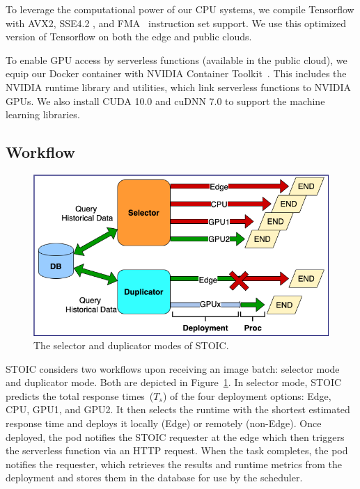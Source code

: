 To leverage the computational power of our CPU systems, we compile Tensorflow with AVX2, SSE4.2 \cite{ref:avx}, and FMA~\cite{ref:fma} instruction set support. We use this optimized version of Tensorflow on both the edge and public clouds.
 
To enable GPU access by serverless functions (available in the public cloud), we equip our Docker container with NVIDIA Container Toolkit~\cite{ref:nvidia}. This includes the NVIDIA runtime library and utilities, which link serverless functions to NVIDIA GPUs. We also install CUDA 10.0 and cuDNN 7.0 to support the machine learning libraries.
 
 
 \subsection{Workflow}

\begin{figure}[t] \centering 
\includegraphics[scale=0.5]{figures/selector_duplicator.png}
\caption{The selector and duplicator modes of STOIC. 
\label{fig:duplicator}}
\end{figure}


STOIC considers two workflows upon receiving an image batch: 
selector mode and duplicator mode. Both are depicted in Figure~\ref{fig:duplicator}. In selector mode, STOIC predicts the total response times~($T_s$) of the four deployment options: Edge, CPU, GPU1, and GPU2.  It then selects the runtime with the shortest estimated response time and deploys it locally (Edge) or remotely (non-Edge). Once deployed, the pod notifies the STOIC requester at the edge which then triggers the serverless function via an HTTP request. When the task completes, the pod notifies the requester, which retrieves the results and runtime metrics from the deployment and stores them in the database for use by the scheduler.

